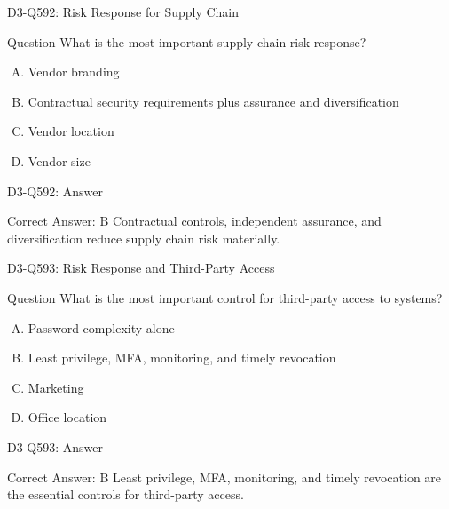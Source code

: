 \documentclass{beamer}
\begin{document}
	\begin{frame}{D3-Q592: Risk Response for Supply Chain}
		\begin{block}{Question}
			What is the most important supply chain risk response?
		\end{block}
		\begin{enumerate}[(A)]
			\item Vendor branding
			\item Contractual security requirements plus assurance and diversification
			\item Vendor location
			\item Vendor size
		\end{enumerate}
	\end{frame}
	\begin{frame}{D3-Q592: Answer}
		\begin{block}{Correct Answer: B}
			Contractual controls, independent assurance, and diversification reduce supply chain risk materially.
		\end{block}
	\end{frame}
	
	\begin{frame}{D3-Q593: Risk Response and Third-Party Access}
		\begin{block}{Question}
			What is the most important control for third-party access to systems?
		\end{block}
		\begin{enumerate}[(A)]
			\item Password complexity alone
			\item Least privilege, MFA, monitoring, and timely revocation
			\item Marketing
			\item Office location
		\end{enumerate}
	\end{frame}
	\begin{frame}{D3-Q593: Answer}
		\begin{block}{Correct Answer: B}
			Least privilege, MFA, monitoring, and timely revocation are the essential controls for third-party access.
		\end{block}
	\end{frame}
	
\end{document}

